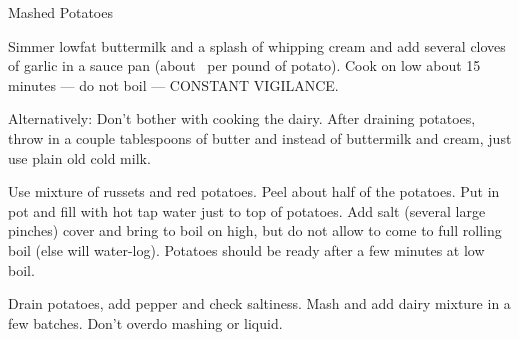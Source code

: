 
\begin{recipe}{Mashed Potatoes}
  \maketitle

  Simmer lowfat buttermilk and a splash of whipping cream and add several
  cloves of garlic in a sauce pan (about \fourth~\cup per {pound} of
  potato). Cook on low about 15 minutes --- do not boil --- CONSTANT
  VIGILANCE.

  Alternatively: Don't bother with cooking the dairy. After draining
  potatoes, throw in a couple tablespoons of butter and instead of
  buttermilk and cream, just use plain old cold milk.

  Use mixture of russets and red potatoes. Peel about half of the potatoes.
  Put in pot and fill with hot tap water just to top of potatoes. Add salt
  (several large pinches) cover and bring to boil on high, but do not allow
  to come to full rolling boil (else will water-log). Potatoes should be
  ready after a few minutes at low boil.

  Drain potatoes, add pepper and check saltiness. Mash and add dairy
  mixture in a few batches. Don't overdo mashing or liquid.

\end{recipe}

